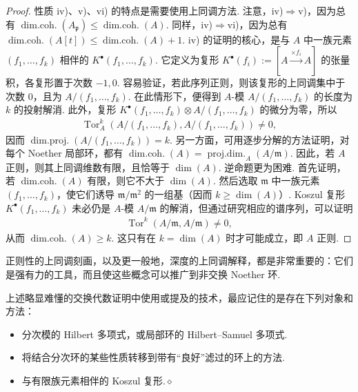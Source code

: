 \begin{proof}
性质 iv)、v)、vi) 的特点是需要使用上同调方法. 注意，iv)$\Rightarrow$v)，因为总有 $\operatorname{dim.coh.}(A_{\mathfrak p})\leqslant\operatorname{dim.coh.}(A)$. 同样，iv)$\Rightarrow$vi)，因为总有 $\operatorname{dim.coh.}(A[t])\leqslant\operatorname{dim.coh.}(A)+1$.
iv) 的证明的核心，是与 $A$ 中一族元素 $(f_1,\ldots,f_k)$ 相伴的 $K^\bullet(f_1,\ldots,f_k)$. 它定义为复形 $K^\bullet(f_i):=[A\xrightarrow{\times f_i}A]$ 的张量积，各复形置于次数 $-1,0$. 容易验证，若此序列正则，则该复形的上同调集中于次数 $0$，且为 $A/(f_1,\ldots,f_k)$. 在此情形下，便得到 $A$-模 $A/(f_1,\ldots,f_k)$ 的长度为 $k$ 的投射解消. 此外，复形 $K^\bullet(f_1,\ldots,f_k)\otimes A/(f_1,\ldots,f_k)$ 的微分为零，所以
\begin{align*}
\operatorname{Tor}_A^k(A/(f_1,\ldots,f_k),A/(f_1,\ldots,f_k))\neq0,
\end{align*}
因而 $\operatorname{dim.proj.}(A/(f_1,\ldots,f_k))=k$. 另一方面，可用逐步分解的方法证明，对每个 Noether 局部环，都有 $\operatorname{dim.coh.}(A)=\operatorname{proj.dim.}_A(A/\mathfrak m)$. 因此，若 $A$ 正则，则其上同调维数有限，且恰等于 $\dim(A)$. 逆命题更为困难. 首先证明，若 $\operatorname{dim.coh.}(A)$ 有限，则它不大于 $\dim(A)$. 然后选取 $\mathfrak m$ 中一族元素 $(f_1,\ldots,f_k)$，使它们诱导 $\mathfrak m/\mathfrak m^2$ 的一组基（因而 $k\geqslant\dim(A)$）. Koszul 复形 $K^\bullet(f_1,\ldots,f_k)$ 未必仍是 $A$-模 $A/\mathfrak m$ 的解消，但通过研究相应的谱序列，可以证明
\begin{align*}
\operatorname{Tor}^k(A/\mathfrak m,A/\mathfrak m)\neq0,
\end{align*}
从而 $\operatorname{dim.coh.}(A)\geqslant k$. 这只有在 $k=\dim(A)$ 时才可能成立，即 $A$ 正则.
\end{proof}
\begin{remark*}
正则性的上同调刻画，以及更一般地，深度的上同调解释，都是非常重要的：它们是强有力的工具，而且使这些概念可以推广到非交换 Noether 环.
\end{remark*}
\begin{remark}\label{item:ag-3-1-11}
上述略显难懂的交换代数证明中使用或提及的技术，最应记住的是存在下列对象和方法：
\begin{itemize}
\item 分次模的 Hilbert 多项式，或局部环的 Hilbert--Samuel 多项式.
\item 将结合分次环的某些性质转移到带有``良好''滤过的环上的方法.
\item 与有限族元素相伴的 Koszul 复形.\unskip\nobreak\hfill\ensuremath{\diamond}
\end{itemize}
\renewcommand{\envenddiamond}{}
\end{remark}
